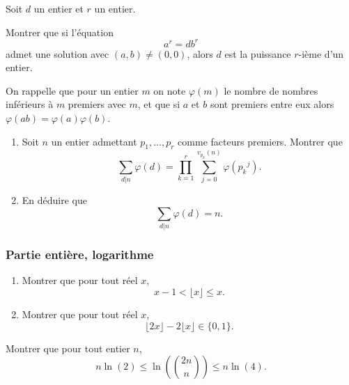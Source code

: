 \begin{exo}
    Soit $d$ un entier et $r$ un entier.

    Montrer que si l'équation
    \[a^r = d b^r\]
    admet une solution avec $(a,b) \neq (0,0)$, alors $d$ est la puissance $r$-ième d'un entier.
\end{exo}

\begin{exo}
    On rappelle que pour un entier $m$ on note $\varphi(m)$ le nombre de nombres inférieurs à $m$ premiers avec $m$, et que si $a$ et $b$ sont premiers entre eux alors $\varphi(ab) = \varphi(a) \varphi(b)$.
    \begin{enumerate}
        \item Soit $n$ un entier admettant $p_1,\ldots,p_r$ comme facteurs premiers. Montrer que
              \[\sum_{d | n} \varphi(d) = \prod_{k=1}^r \sum_{j=0}^{v_{p_k}(n)} \varphi({p_k}^j).\]
        \item En déduire que
              \[\sum_{d | n} \varphi(d) = n.\]
    \end{enumerate}
\end{exo}

\subsubsection{Partie entière, logarithme}

\begin{exo}
    \begin{enumerate}
        \item Montrer que pour tout réel $x$,
              \[x-1 < \lfloor x \rfloor \leq x.\]
        \item Montrer que pour tout réel $x$,
              \[\lfloor 2 x \rfloor  - 2 \lfloor x \rfloor \in \{0,1\}.\]
    \end{enumerate}
\end{exo}

\begin{exo}
    Montrer que pour tout entier $n$,
    \[n \ln(2) \leq \ln \left(\binom{2n}{n} \right) \leq n \ln(4).\]
\end{exo}


